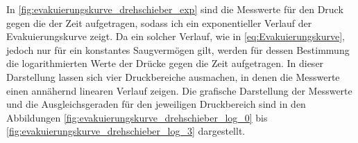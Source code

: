 

In \cref{fig:evakuierungskurve_drehschieber_exp} sind die Messwerte für den Druck gegen die der Zeit aufgetragen,
sodass ich ein exponentieller Verlauf der Evakuierungskurve zeigt. Da ein solcher Verlauf, wie in 
\eqref{eq:Evakuierungskurve}, jedoch nur für ein konstantes Saugvermögen gilt, werden für dessen Bestimmung die logarithmierten Werte der Drücke gegen die Zeit aufgetragen.
In dieser Darstellung lassen sich vier Druckbereiche ausmachen,
in denen die Messwerte einen annähernd linearen Verlauf zeigen. Die grafische Darstellung der Messwerte und die 
Ausgleichsgeraden für den jeweiligen Druckbereich sind in den Abbildungen \ref{fig:evakuierungskurve_drehschieber_log_0} 
bis \ref{fig:evakuierungskurve_drehschieber_log_3} dargestellt.\\



{%

\FloatBarrier}

{%

\FloatBarrier

\FloatBarrier

\FloatBarrier

\FloatBarrier}

